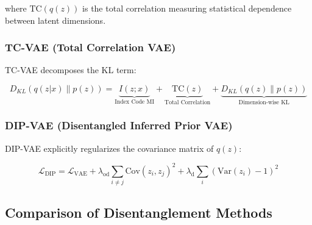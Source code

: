 \documentclass[conference]{IEEEtran}
\begin{document}
where $\text{TC}(q(z))$ is the total correlation measuring statistical dependence between latent dimensions.

\subsubsection{TC-VAE (Total Correlation VAE)}

TC-VAE decomposes the KL term:

\begin{equation}
D_{KL}(q(z|x) \| p(z)) = \underbrace{I(z; x)}_{\text{Index Code MI}} + \underbrace{\text{TC}(z)}_{\text{Total Correlation}} + \underbrace{D_{KL}(q(z) \| p(z))}_{\text{Dimension-wise KL}}
\end{equation}

\subsubsection{DIP-VAE (Disentangled Inferred Prior VAE)}

DIP-VAE explicitly regularizes the covariance matrix of $q(z)$:

\begin{equation}
\mathcal{L}_{\text{DIP}} = \mathcal{L}_{\text{VAE}} + \lambda_{\text{od}} \sum_{i \neq j} \text{Cov}(z_i, z_j)^2 + \lambda_{\text{d}} \sum_{i} (\text{Var}(z_i) - 1)^2
\end{equation}

\subsection{Comparison of Disentanglement Methods}

\begin{table}[!t]
\centering
\small
{}
\caption{Comparison of VAE variants for disentanglement}
\label{tab:vae_variants}
\end{table}
\end{document}
